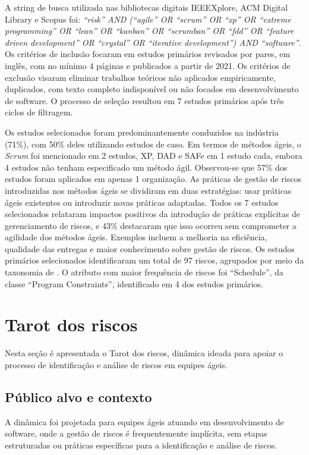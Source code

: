 \documentclass[12pt]{article}
\begin{document}
A string de busca utilizada nas bibliotecas digitais IEEEXplore, ACM Digital Library e Scopus foi: \textit{“risk” AND (“agile” OR “scrum” OR “xp” OR “extreme programming” OR “lean” OR “kanban” OR “scrumban” OR “fdd” OR “feature driven development” OR “crystal” OR “iterative development”) AND “software”}. Os critérios de inclusão focaram em estudos primários revisados por pares, em inglês, com no mínimo 4 páginas e publicados a partir de 2021. Os critérios de exclusão visaram eliminar trabalhos teóricos não aplicados empiricamente, duplicados, com texto completo indisponível ou não focados em desenvolvimento de software. O processo de seleção resultou em 7 estudos primários após três ciclos de filtragem.

Os estudos selecionados foram predominantemente conduzidos na indústria (71\%), com 50\% deles utilizando estudos de caso. Em termos de métodos ágeis, o \textit{Scrum} foi mencionado em 2 estudos, XP, DAD e SAFe em 1 estudo cada, embora 4 estudos não tenham especificado um método ágil. Observou-se que 57\% dos estudos foram aplicados em apenas 1 organização. As práticas de gestão de riscos introduzidas nos métodos ágeis se dividiram em duas estratégias: usar práticas ágeis existentes ou introduzir novas práticas adaptadas. Todos os 7 estudos selecionados relataram impactos positivos da introdução de práticas explícitas de gerenciamento de riscos, e 43\% destacaram que isso ocorreu sem comprometer a agilidade dos métodos ágeis. Exemplos incluem a melhoria na eficiência, qualidade das entregas e maior conhecimento sobre gestão de riscos. Os estudos primários selecionados identificaram um total de 97 riscos, agrupados por meio da taxonomia de \cite{carr_1993}. O atributo com maior frequência de riscos foi “Schedule”, da classe “Program Constraints”, identificado em 4 dos estudos primários.

\section{Tarot dos riscos}
Nesta seção é apresentada o Tarot dos riscos, dinâmica ideada para apoiar o processo de identificação e análise de riscos em equipes ágeis.

\subsection{Público alvo e contexto}

A dinâmica foi projetada para equipes ágeis atuando em desenvolvimento de software, onde a gestão de riscos é frequentemente implícita, sem etapas estruturadas ou práticas específicas para a identificação e análise de riscos.
\end{document}
